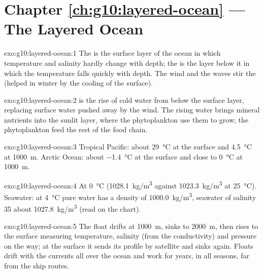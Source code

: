 \section*{Chapter \ref{ch:g10:layered-ocean} --- The Layered Ocean}

\begin{solution}{exo:g10:layered-ocean:1}
The  is the surface layer of the ocean in which temperature and
salinity hardly change with depth; the  is the layer below it in
which the temperature falls quickly with depth. The wind and the waves stir
the  (helped in winter by the cooling of the surface).
\end{solution}

\begin{solution}{exo:g10:layered-ocean:2}
 is the rise of cold water from below the surface layer, replacing
surface water pushed away by the wind. The rising water brings mineral
nutrients into the sunlit layer, where the phytoplankton use them to grow;
the phytoplankton feed the rest of the food chain.
\end{solution}

\begin{solution}{exo:g10:layered-ocean:3}
Tropical Pacific: about \qty{29}{\degreeCelsius} at the surface and
\qty{4.5}{\degreeCelsius} at \qty{1000}{m}. Arctic Ocean: about
\qty{-1.4}{\degreeCelsius} at the surface and close to
\qty{0}{\degreeCelsius} at \qty{1000}{m}.
\end{solution}

\begin{solution}{exo:g10:layered-ocean:4}
At \qty{0}{\degreeCelsius} (\qty{1028.1}{kg/m^3} against \qty{1023.3}{kg/m^3}
at \qty{25}{\degreeCelsius}). Seawater: at \qty{4}{\degreeCelsius} pure water
has a density of \qty{1000.0}{kg/m^3}, seawater of salinity 35 about
\qty{1027.8}{kg/m^3} (read on the chart).
\end{solution}

\begin{solution}{exo:g10:layered-ocean:5}
The float drifts at \qty{1000}{m}, sinks to \qty{2000}{m}, then rises to the
surface measuring temperature, salinity (from the conductivity) and pressure
on the way; at the surface it sends its profile by satellite and sinks again.
Floats drift with the currents all over the ocean and work for years, in all
seasons, far from the ship routes.
\end{solution}

